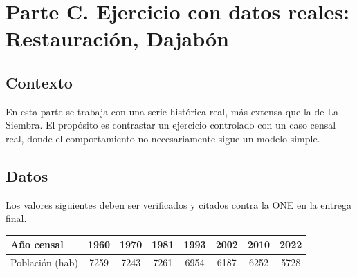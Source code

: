 \documentclass[11pt]{scrartcl}
\begin{document}
\section{Parte C. Ejercicio con datos reales: Restauración, Dajabón}

\subsection{Contexto}
En esta parte se trabaja con una serie histórica real, más extensa que
la de La Siembra. El propósito es contrastar un ejercicio controlado con
un caso censal real, donde el comportamiento no necesariamente sigue un
modelo simple.

\subsection{Datos}
Los valores siguientes deben ser verificados y citados contra la ONE en
la entrega final.

\begin{center}
\begin{tabular}{l *{7}{S[table-format=4.0]}}
  \toprule
  {Año censal} & {1960} & {1970} & {1981} & {1993} & {2002} & {2010} & {2022} \\
  \midrule
  {Población (hab)} & 7259 & 7243 & 7261 & 6954 & 6187 & 6252 & 5728 \\
  \bottomrule
\end{tabular}
\end{center}
\end{document}
